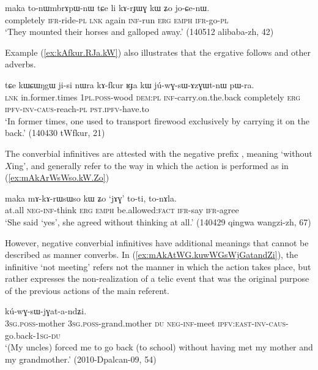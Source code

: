 \begin{exe}
\ex \label{ex:kArJWG.kW.Zo}
\gll maka to-nɯmbrɤpɯ-nɯ tɕe li kɤ-rɟɯɣ kɯ ʑo jo-ɕe-nɯ. \\
completely \textsc{ifr}-ride-\textsc{pl} \textsc{lnk} again \textsc{inf}-run \textsc{erg} \textsc{emph} \textsc{ifr}-go-\textsc{pl} \\
\glt `They mounted their horses and galloped away.' (140512 alibaba-zh, 42)
\end{exe}

Example (\ref{ex:kAfkur.RJa.kW}) also illustrates that the ergative  follows  and other adverbs.

\begin{exe}
\ex \label{ex:kAfkur.RJa.kW}
\gll tɕe kɯɕɯŋgɯ ji-si nɯra kɤ-fkur ʁɟa kɯ jú-wɣ-sɯ-ɤzɣɯt-nɯ pɯ-ra. \\
\textsc{lnk} in.former.times \textsc{1pl}.\textsc{poss}-wood \textsc{dem}:\textsc{pl} \textsc{inf}-carry.on.the.back completely \textsc{erg} \textsc{ipfv}-\textsc{inv}-\textsc{caus}-reach-\textsc{pl} \textsc{pst}.\textsc{ipfv}-have.to \\
\glt `In former times, one used to transport firewood exclusively by carrying it on the back.' (140430 tWfkur, 21)
\end{exe}

The converbial infinitives are attested with the negative prefix , meaning `without $X$ing', and generally refer to the way in which the action is performed as in (\ref{ex:mAkArWsWso.kW.Zo})

\begin{exe}
\ex \label{ex:mAkArWsWso.kW.Zo}
\gll   maka mɤ-kɤ-rɯsɯso kɯ ʑo `jɤɣ' to-ti, to-nɤla. \\
at.all \textsc{neg}-\textsc{inf}-think \textsc{erg} \textsc{emph} be.allowed:\textsc{fact} \textsc{ifr}-say \textsc{ifr}-agree \\
\glt `She said `yes', she agreed without thinking at all.' (140429 qingwa wangzi-zh, 67)
\end{exe}

However, negative converbial infinitives have additional meanings that cannot be described as manner converbs. In (\ref{ex:mAkAtWG.kuwWGsWjGatandZi}), the infinitive  `not meeting' refers not the manner in which the action takes place, but rather expresses the non-realization of a telic event that was the original purpose of the previous actions of the main referent. 

\begin{exe}
\ex \label{ex:mAkAtWG.kuwWGsWjGatandZi}
\gll [a-mu a-wi ni mɤ-kɤ-ɤtɯɣ] kú-wɣ-sɯ-jɣat-a-ndʑi. \\
\textsc{3sg}.\textsc{poss}-mother \textsc{3sg}.\textsc{poss}-grand.mother \textsc{du} \textsc{neg}-\textsc{inf}-meet \textsc{ipfv}:\textsc{east}-\textsc{inv}-\textsc{caus}-go.back-\textsc{1sg}-\textsc{du} \\
\glt `(My uncles) forced me to go back (to school) without having met my mother and my grandmother.' (2010-Dpalcan-09, 54)
\end{exe}

